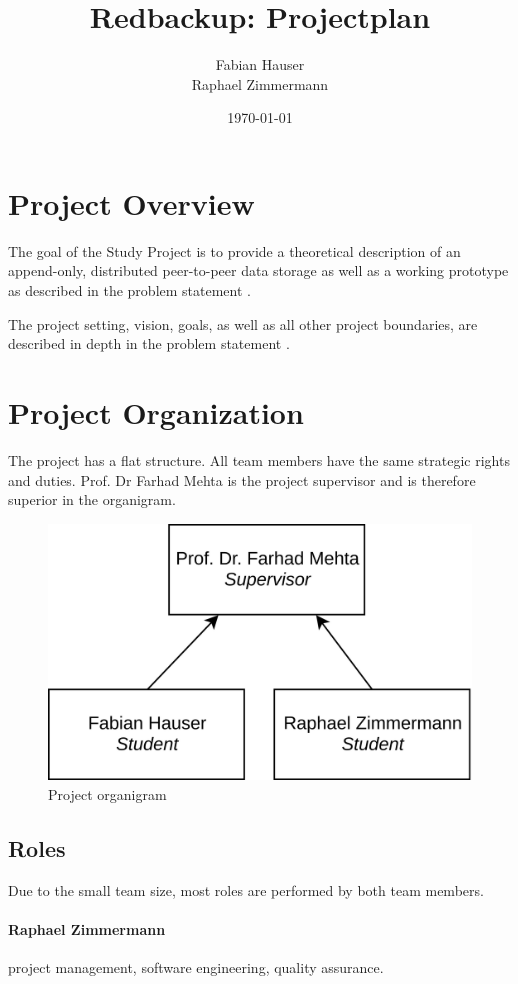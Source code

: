 \documentclass[a4paper]{article}
\title{Redbackup: Projectplan}
\author{
		Fabian Hauser \\
		Raphael Zimmermann
}
\date{\today}
\begin{document}
\maketitle

\section{Project Overview}
The goal of the Study Project is to provide a theoretical description of an append-only, distributed peer-to-peer data storage as well as a working prototype as described in the problem statement \cite{problemstatement}.

The project setting, vision, goals, as well as all other project boundaries, are described in depth in the problem statement \cite{problemstatement}.

\section{Project Organization}

The project has a flat structure. All team members have the same strategic rights and duties. Prof. Dr Farhad Mehta is the project supervisor and is therefore superior in the organigram.

\begin{figure}[H]
	\centering
	\includegraphics[width=0.5\linewidth]{resources/organigram}
	\caption[Organigram]{Project organigram}
	\label{fig:organigram}
\end{figure}

\subsection{Roles}

Due to the small team size, most roles are performed by both team members.

\paragraph{Raphael Zimmermann} project management, software engineering, quality assurance.
\end{document}
